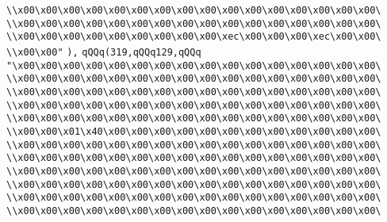 \verb|\\x00\x00\x00\x00\x00\x00\x00\x00\x00\x00\x00\x00\x00\x00\x00\x00\|\newline
\verb|\\x00\x00\x00\x00\x00\x00\x00\x00\x00\x00\x00\x00\x00\x00\x00\x00\|\newline
\verb|\\x00\x00\x00\x00\x00\x00\x00\x00\x00\xec\x00\x00\x00\xec\x00\x00\|\newline
\verb|\\x00\x00"|\newline
\verb|),|\newline
\verb|qQQq(319,qQQq129,qQQq|\newline
\verb|"\x00\x00\x00\x00\x00\x00\x00\x00\x00\x00\x00\x00\x00\x00\x00\x00\|\newline
\verb|\\x00\x00\x00\x00\x00\x00\x00\x00\x00\x00\x00\x00\x00\x00\x00\x00\|\newline
\verb|\\x00\x00\x00\x00\x00\x00\x00\x00\x00\x00\x00\x00\x00\x00\x00\x00\|\newline
\verb|\\x00\x00\x00\x00\x00\x00\x00\x00\x00\x00\x00\x00\x00\x00\x00\x00\|\newline
\verb|\\x00\x00\x00\x00\x00\x00\x00\x00\x00\x00\x00\x00\x00\x00\x00\x00\|\newline
\verb|\\x00\x00\x01\x40\x00\x00\x00\x00\x00\x00\x00\x00\x00\x00\x00\x00\|\newline
\verb|\\x00\x00\x00\x00\x00\x00\x00\x00\x00\x00\x00\x00\x00\x00\x00\x00\|\newline
\verb|\\x00\x00\x00\x00\x00\x00\x00\x00\x00\x00\x00\x00\x00\x00\x00\x00\|\newline
\verb|\\x00\x00\x00\x00\x00\x00\x00\x00\x00\x00\x00\x00\x00\x00\x00\x00\|\newline
\verb|\\x00\x00\x00\x00\x00\x00\x00\x00\x00\x00\x00\x00\x00\x00\x00\x00\|\newline
\verb|\\x00\x00\x00\x00\x00\x00\x00\x00\x00\x00\x00\x00\x00\x00\x00\x00\|\newline
\verb|\\x00\x00\x00\x00\x00\x00\x00\x00\x00\x00\x00\x00\x00\x00\x00\x00\|\newline
